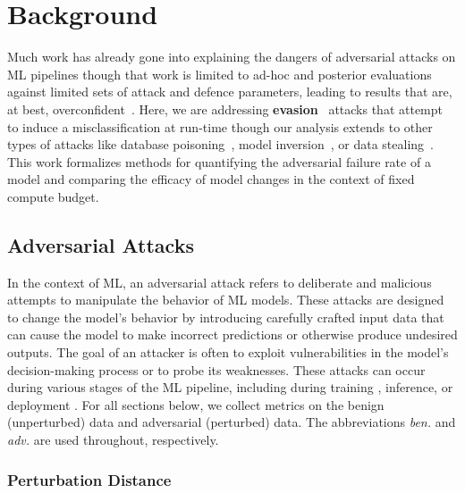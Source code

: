\section{Background}


Much work has already gone into explaining the dangers of adversarial attacks on ML pipelines \citep{carlini_towards_2017,croce_reliable_2020,pixelattack,fgm,biggio_evasion_2013} though that work is limited to ad-hoc and posterior evaluations against limited sets of attack and defence parameters, leading to results that are, at best, overconfident~\citep{meyers,ma2020imbalanced}. Here, we are addressing \textbf{evasion}~\citep{carlini_towards_2017} attacks that attempt to induce a misclassification at run-time though our analysis extends to other types of attacks like database poisoning~\citep{biggio_poisoning_2013, saha2020hidden}, model inversion~\citep{choquette2021label,li2021membership}, or data stealing~\citep{orekondy2019knockoff}. This work formalizes methods for quantifying the adversarial failure rate of a model and comparing the efficacy of model changes in the context of fixed compute budget.

\subsection{Adversarial Attacks}

In the context of ML, an adversarial attack refers to deliberate and malicious attempts to manipulate the behavior of ML models. These attacks are designed to change the model's behavior by introducing carefully crafted input data that can cause the model to make incorrect predictions or otherwise produce undesired outputs.
The goal of an attacker is often to exploit vulnerabilities in the model's decision-making process or to probe its weaknesses. These attacks can occur during various stages of the ML pipeline, including during training \citep{biggio_poisoning_2013}, inference\citep{biggio_evasion_2013}, or deployment \citep{santos2021universal}. For all sections below, we collect metrics on the benign (unperturbed) data and adversarial (perturbed) data. The abbreviations \textit{ben.} and \textit{adv.} are used throughout, respectively.


\subsubsection{Perturbation Distance}


